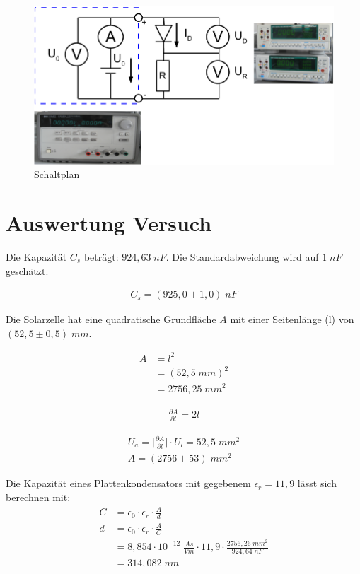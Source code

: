\documentclass[a4paper]{scrartcl}
\numberwithin{equation}{subsection}
\begin{document}
\begin{figure}[H]
\includegraphics[width=16cm]{Schaltplan}
\centering
\caption{Schaltplan}
\centering
\label{fig:Schaltplan}
\end{figure}

\newpage
\section{Auswertung Versuch}
Die Kapazität $C_s$ beträgt: $924,63\;nF$. Die Standardabweichung wird
auf $1\;nF$ geschätzt.

\begin{align*}
C_s = (925,0\pm 1,0)\;nF	
\end{align*}

Die Solarzelle hat eine quadratische Grundfläche $A$ mit einer Seitenlänge (l)
von $(52,5\pm 0,5)\;mm$.

\begin{align*}
A &= l^2 \\
 &= (52,5\;mm)^2 \\
 &= 2756,25\;mm^2
\end{align*}

\begin{align}
\frac{\partial A}{\partial l} = 2l
\end{align}

\begin{align*}
U_a = \bigg | \frac{\partial A}{\partial l} \bigg | \cdot U_l = 52,5\;mm^2 \\
A = (2756\pm 53)\;mm^2
\end{align*}

Die Kapazität eines Plattenkondensators mit gegebenem $\epsilon_r = 11,9$ lässt sich berechnen mit:
\begin{align*}
C &= \epsilon_0 \cdot \epsilon_r \cdot \frac{A}{d} \\
d &= \epsilon_0 \cdot \epsilon_r \cdot \frac{A}{C} \\
  &= 8,854 \cdot 10^{-12}\; \frac{As}{Vm} \cdot 11,9 \cdot \frac{2756,26 \; mm^2}{924,64 \; nF} \\
  &= 314,082 \; nm 
\end{align*}
\end{document}
